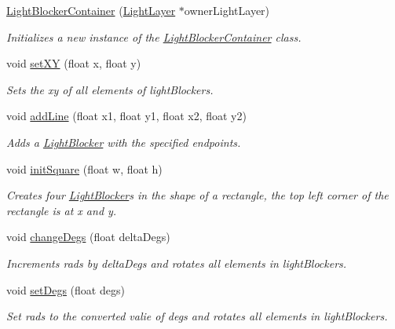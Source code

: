 \begin{DoxyCompactItemize}
\item 
\hyperlink{classlighting_1_1LightBlockerContainer_ab63ac1d2b3f76c20f3b710ee4f68d688}{Light\+Blocker\+Container} (\hyperlink{classlighting_1_1LightLayer}{Light\+Layer} $\ast$owner\+Light\+Layer)
\begin{DoxyCompactList}\small\item\em Initializes a new instance of the \hyperlink{classlighting_1_1LightBlockerContainer}{Light\+Blocker\+Container} class. \end{DoxyCompactList}\item 
void \hyperlink{classlighting_1_1LightBlockerContainer_acc38ded99d75f0cedfa39a02b392ced5}{set\+XY} (float x, float y)
\begin{DoxyCompactList}\small\item\em Sets the xy of all elements of light\+Blockers. \end{DoxyCompactList}\item 
void \hyperlink{classlighting_1_1LightBlockerContainer_aa7fafc6b67c9bc6e58e627422cc4d16f}{add\+Line} (float x1, float y1, float x2, float y2)
\begin{DoxyCompactList}\small\item\em Adds a \hyperlink{classlighting_1_1LightBlocker}{Light\+Blocker} with the specified endpoints. \end{DoxyCompactList}\item 
void \hyperlink{classlighting_1_1LightBlockerContainer_a38159ca0d187d45bdeb3f1b2f1e15796}{init\+Square} (float w, float h)
\begin{DoxyCompactList}\small\item\em Creates four \hyperlink{classlighting_1_1LightBlocker}{Light\+Blocker}s in the shape of a rectangle, the top left corner of the rectangle is at x and y. \end{DoxyCompactList}\item 
void \hyperlink{classlighting_1_1LightBlockerContainer_a9e273caf0cb1d65912b76785def3ef0e}{change\+Degs} (float delta\+Degs)
\begin{DoxyCompactList}\small\item\em Increments rads by {\itshape delta\+Degs}  and rotates all elements in light\+Blockers. \end{DoxyCompactList}\item 
void \hyperlink{classlighting_1_1LightBlockerContainer_a1488a92c30ede9e9f0ebead097e935ac}{set\+Degs} (float degs)
\begin{DoxyCompactList}\small\item\em Set rads to the converted valie of {\itshape degs}  and rotates all elements in light\+Blockers. \end{DoxyCompactList}\item 

\end{DoxyCompactItemize}
